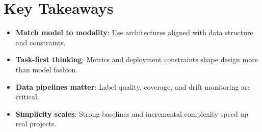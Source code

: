
\section*{Key Takeaways}

\begin{keytakeaways}
\begin{itemize}[leftmargin=2em]
    \item \textbf{Match model to modality}: Use architectures aligned with data structure and constraints.
    \item \textbf{Task-first thinking}: Metrics and deployment constraints shape design more than model fashion.
    \item \textbf{Data pipelines matter}: Label quality, coverage, and drift monitoring are critical.
    \item \textbf{Simplicity scales}: Strong baselines and incremental complexity speed up real projects.
\end{itemize}
\end{keytakeaways}


